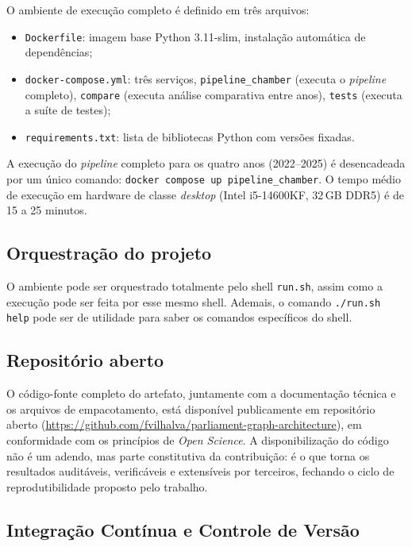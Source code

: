 \documentclass[
      12pt,
      a4paper,
      openright,
      oneside,
      chapter=TITLE,
      section=TITLE,
      english,
      french,
      spanish,
      brazilian
    ]{abntex2}
\begin{document}
    O ambiente de execução completo é definido em três arquivos:
    
    \begin{itemize}
        \item \texttt{Dockerfile}: imagem base Python 3.11-slim, instalação automática de dependências;
        \item \texttt{docker-compose.yml}: três serviços, \texttt{pipeline\_chamber} (executa o \textit{pipeline} completo), \texttt{compare} (executa análise comparativa entre anos), \texttt{tests} (executa a suíte de testes);
        \item \texttt{requirements.txt}: lista de bibliotecas Python com versões fixadas.
    \end{itemize}
    
    A execução do \textit{pipeline} completo para os quatro anos (2022--2025) é desencadeada por um único comando: \texttt{docker compose up pipeline\_chamber}. O tempo médio de execução em hardware de classe \textit{desktop} (Intel i5-14600KF, 32\,GB DDR5) é de 15 a 25 minutos.
    
    
    
    \subsection{Orquestração do projeto}
    
    O ambiente pode ser orquestrado totalmente pelo shell \texttt{run.sh}, assim como a execução pode ser feita por esse mesmo shell. Ademais, o comando \texttt{./run.sh help} pode ser de utilidade para saber os comandos específicos do shell.
    
    \subsection{Repositório aberto}

    O código-fonte completo do artefato, juntamente com a documentação técnica e os
    arquivos de empacotamento, está disponível publicamente em repositório aberto
    (\url{https://github.com/fvilhalva/parliament-graph-architecture}), em
    conformidade com os princípios de \textit{Open Science}. A disponibilização do
    código não é um adendo, mas parte constitutiva da contribuição: é o que torna os
    resultados auditáveis, verificáveis e extensíveis por terceiros, fechando o ciclo
    de reprodutibilidade proposto pelo trabalho.

    \subsection{Integração Contínua e Controle de Versão}
    \label{subsec:ci}
\end{document}
